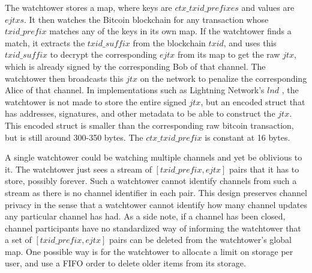 The watchtower stores a map, where keys are $\mathit{ctx\_txid\_prefixes}$ and values are $\mathit{ejtxs}$. It then watches the Bitcoin blockchain for any transaction whose $\mathit{txid\_prefix}$ matches any of the keys in its own map. If the watchtower finds a match, it extracts the $\mathit{txid\_suffix}$ from the blockchain $\mathit{txid}$, and uses this $\mathit{txid\_suffix}$ to decrypt the corresponding $\mathit{ejtx}$ from its map to get the raw $\mathit{jtx}$, which is already signed by the corresponding Bob of that channel. The watchtower then broadcasts this $\mathit{jtx}$ on the network to penalize the corresponding Alice of that channel. In implementations such as Lightning Network's $\mathit{lnd}$ \cite{lnd}, the watchtower is not made to store the entire signed $\mathit{jtx}$, but an encoded struct that has addresses, signatures, and other metadata to be able to construct the $\mathit{jtx}$. This encoded struct is smaller than the corresponding raw bitcoin transaction, but is still around 300-350 bytes. The $\mathit{ctx\_txid\_prefix}$ is constant at 16 bytes.

A single watchtower could be watching multiple channels and yet be oblivious to it. The watchtower just sees a stream of \sloppy $\mathit{[txid\_prefix, ejtx]}$ pairs that it has to store, possibly forever. Such a watchtower cannot identify channels from such a stream as there is no channel identifier in each pair. This design preserves channel privacy in the sense that a watchtower cannot identify how many channel updates any particular channel has had. As a side note, if a channel has been closed, channel participants have no standardized way of informing the watchtower that a set of $\mathit{[txid\_prefix, ejtx]}$ pairs can be deleted from the watchtower's global map. One possible way is for the watchtower to allocate a limit on storage per user, and use a FIFO order to delete older items from its storage.

